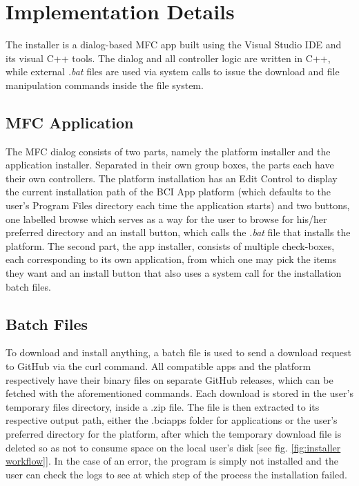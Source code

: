 \section{Implementation Details} \label{sect: Installer implementation}
The installer is a dialog-based MFC app built using the Visual Studio IDE and its visual C++ tools. The dialog and all controller logic are written in C++, while external \textit{.bat} files are used via system calls to issue the download and file manipulation commands inside the file system.

\subsection{MFC Application} \label{subsect: Installer MFC application}
The MFC dialog consists of two parts, namely the platform installer and the application installer. Separated in their own group boxes, the parts each have their own controllers. The platform installation has an Edit Control to display the current installation path of the BCI App platform (which defaults to the user's Program Files directory each time the application starts) and two buttons, one labelled browse which serves as a way for the user to browse for his/her preferred directory and an install button, which calls the \textit{.bat} file that installs the platform. The second part, the app installer, consists of multiple check-boxes, each corresponding to its own application, from which one may pick the items they want and an install button that also uses a system call for the installation batch files. 

\subsection{Batch Files} \label{subsect: Installer batch files}
To download and install anything, a batch file is used to send a download request to GitHub via the curl command. All compatible apps and the platform respectively have their binary files on separate GitHub releases, which can be fetched with the aforementioned commands. Each download is stored in the user's temporary files directory, inside a .zip file. The file is then extracted to its respective output path, either the .bciapps folder for applications or the user's preferred directory for the platform, after which the temporary download file is deleted so as not to consume space on the local user's disk [see fig. \ref{fig:installer workflow}]. In the case of an error, the program is simply not installed and the user can check the logs to see at which step of the process the installation failed.

